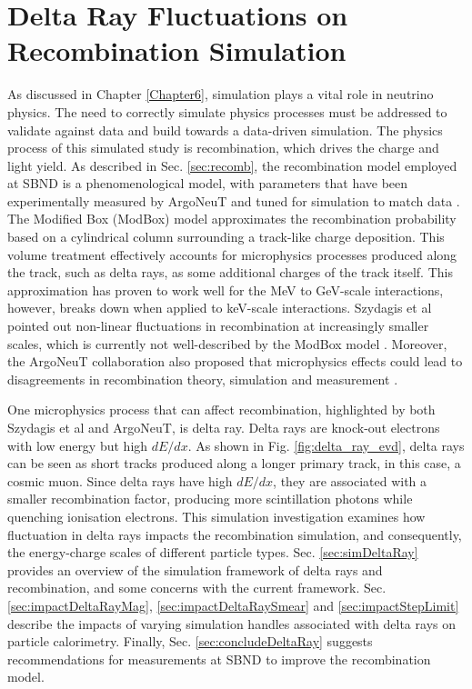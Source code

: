 
\section{Delta Ray Fluctuations on Recombination Simulation}
\label{sec7:delta}

As discussed in Chapter \ref{Chapter6}, simulation plays a vital role in neutrino physics.
The need to correctly simulate physics processes must be addressed to validate against data and build towards a data-driven simulation.
The physics process of this simulated study is recombination, which drives the charge and light yield.                                              
As described in Sec. \ref{sec:recomb}, the recombination model employed at SBND is a phenomenological model, with parameters that have been experimentally measured by ArgoNeuT and tuned for simulation to match data \cite{argoneut_recomb}.
The Modified Box (ModBox) model approximates the recombination probability based on a cylindrical column surrounding a track-like charge deposition.
This volume treatment effectively accounts for microphysics processes produced along the track, such as delta rays, as some additional charges of the track itself.
This approximation has proven to work well for the MeV to GeV-scale interactions, however, breaks down when applied to keV-scale interactions.
Szydagis et al pointed out non-linear fluctuations in recombination at increasingly smaller scales, which is currently not well-described by the ModBox model \cite{NEST}.   
Moreover, the ArgoNeuT collaboration also proposed that microphysics effects could lead to disagreements in recombination theory, simulation and measurement \cite{argoneut_recomb}.

One microphysics process that can affect recombination, highlighted by both Szydagis et al and ArgoNeuT, is delta ray.
Delta rays are knock-out electrons with low energy but high $dE/dx$.
As shown in Fig. \ref{fig:delta_ray_evd}, delta rays can be seen as short tracks produced along a longer primary track, in this case, a cosmic muon.                      
Since delta rays have high $dE/dx$, they are associated with a smaller recombination factor, producing more scintillation photons while quenching ionisation electrons.
This simulation investigation examines how fluctuation in delta rays impacts the recombination simulation, and consequently, the energy-charge scales of different particle types.
Sec. \ref{sec:simDeltaRay} provides an overview of the simulation framework of delta rays and recombination, and some concerns with the current framework.
Sec. \ref{sec:impactDeltaRayMag}, \ref{sec:impactDeltaRaySmear} and \ref{sec:impactStepLimit} describe the impacts of varying simulation handles associated with delta rays on particle calorimetry.
Finally, Sec. \ref{sec:concludeDeltaRay} suggests recommendations for measurements at SBND to improve the recombination model.             

